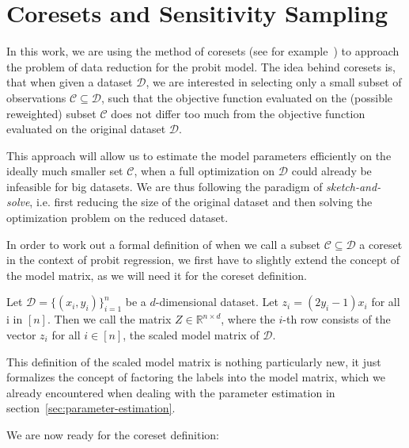 \section{Coresets and Sensitivity Sampling}

In this work, we are using the method of coresets
(see for example~\cite{munteanu-coresets-introduction})
to approach the problem of data reduction for the probit model.
The idea behind coresets is, that when given a
dataset $\mathcal{D}$, we are interested in selecting
only a small subset of observations
$\mathcal{C} \subseteq \mathcal{D}$, such that the objective
function evaluated on the (possible reweighted) subset $\mathcal{C}$
does not differ too much
from the objective function evaluated on the original dataset $\mathcal{D}$.

This approach will allow us to estimate the model parameters
efficiently on the ideally much smaller set $\mathcal{C}$,
when a full optimization on $\mathcal{D}$ could already
be infeasible for big datasets.
We are thus following the paradigm of \textit{sketch-and-solve},
i.e. first reducing the size of the original dataset and then solving
the optimization problem on the reduced dataset.

In order to work out a formal definition of when we call a subset
$\mathcal{C} \subseteq \mathcal{D}$ a coreset in the context of
probit regression, we first have to slightly extend the
concept of the model matrix, as we will need it for the coreset
definition.

\begin{definition}
    Let $\mathcal{D}=\{(x_i, y_i)\}_{i=1}^n$ be a $d$-dimensional dataset.
    Let $z_i = (2y_i - 1)x_i$ for all i in $[n]$.
    Then we call the matrix $Z \in \mathbb{R}^{n \times d}$, where the
    $i$-th row consists of the vector $z_i$ for all $i \in [n]$,
    the scaled model matrix of $\mathcal{D}$.
\end{definition}

This definition of the scaled model matrix is nothing particularly new,
it just formalizes the concept of factoring the labels into the
model matrix, which we already encountered when dealing with the
parameter estimation in section~\ref{sec:parameter-estimation}.

We are now ready for the coreset definition:

